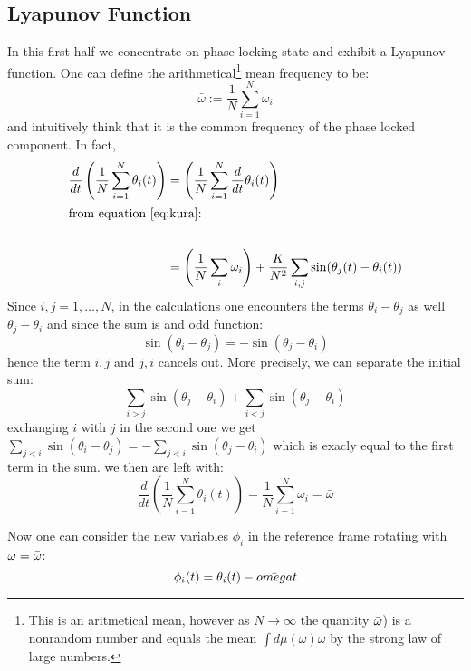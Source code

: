 \subsection{Lyapunov Function }

In this first half we concentrate on phase locking state and exhibit a Lyapunov function.
One can define the arithmetical\footnote{ This is an aritmetical mean, however as $N \to \infty$ the quantity $\Bar{\omega}$) is a nonrandom number and equals the mean $\int d \mu(\omega) \omega$ by the strong law of large numbers.} mean frequency to be: 
\begin{equation}
\bar{\omega}:=\frac{1}{N} \sum_{i=1}^N \omega_i
\label{eq: meanOmega}
\end{equation}
and intuitively think that it is the common frequency of the phase locked component. In fact, 
\begin{align*}
    \frac{d}{d t}\left(\frac{1}{N} \sum_{i=1}^N \theta_i(t)\right)&= \left(\frac{1}{N} \sum_{i=1}^N \frac{d}{d t} \theta_i(t)\right) \\
\intertext{from equation \ref{eq:kura}:} \\ 
&= \left( \frac{1}{N} \sum_i \omega_i \right) + \frac{K}{N^2} \sum_{i,j} \sin(\theta_j(t) - \theta_i(t))
\end{align*}
Since $i, j = 1, \dots , N$, in the calculations one encounters the terms $\theta_i - \theta_j$ as well $\theta_j - \theta_i$ and since the sum is and odd function: 
\begin{equation*}
    \sin(\theta_i - \theta_j) = - \sin(\theta_j - \theta_i) 
\end{equation*}
hence the term $i,j$ and $j,i$ cancels out.
More precisely, we can separate the initial sum: 
\begin{equation*}
    \sum_{i>j} \sin(\theta_j - \theta_i) +  \sum_{i<j} \sin(\theta_j - \theta_i) 
\end{equation*}
exchanging $i$ with $j$ in the second one we get $\sum_{j<i} \sin(\theta_i - \theta_j) = - \sum_{j<i} \sin(\theta_j - \theta_i) $ which is exacly equal to the first term in the sum. 
we then are left with: 
\begin{equation}
    \frac{d}{d t}\left(\frac{1}{N} \sum_{i=1}^N \theta_i(t)\right) = \frac{1}{N} \sum_{i=1}^N \omega_i = \bar{\omega}
\end{equation}

Now one can consider the new variables $\phi_i$ in the reference frame rotating with $\omega=\Bar{\omega}$: 
\begin{equation*}
    \phi_i(t) = \theta_i(t) - \Bar{omega}t
\end{equation*}

